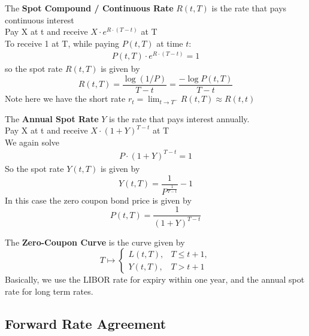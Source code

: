 \begin{definition}
    The \textbf{Spot Compound / Continuous Rate} $R(t, T)$ is the rate that pays continuous interest\\
    Pay X at t and receive $X \cdot e^{R \cdot (T - t)}$ at T \\
    To receive 1 at T, while paying $P(t, T)$ at time $t$: 
    \begin{align*}
        P(t, T) \cdot e^{R \cdot (T - t)} = 1 
    \end{align*}
    so the spot rate $R(t, T)$ is given by
    $$
        R(t, T) = \frac{\log(1/P)}{T - t} = 
        \frac{-\log P(t, T)}{T - t}
    $$
    Note here we have the short rate $r_t = \lim_{t \to T^-}R(t, T) \approx R(t, t)$
\end{definition}

\begin{definition}
    The \textbf{Annual Spot Rate} $Y$ is the rate that pays interest annually. \\
    Pay X at t and receive $X \cdot (1 + Y)^{T - t}$ at T \\
    We again solve
    \begin{align*}
        P \cdot (1 + Y)^{T - t} = 1
    \end{align*}
    So the spot rate $Y(t, T)$ is given by
    $$
        Y(t, T) = \frac{1}{P^\frac{1}{T - t}} - 1
    $$
    In this case the zero coupon bond price is given by
    $$
        P(t, T) = \frac{1}{(1 + Y)^{T - t}}
    $$
\end{definition}

\begin{definition}
    The \textbf{Zero-Coupon Curve} is the curve given by
$$
    T \mapsto 
\begin{cases} 
    L(t, T), &  T \leq t+1, \\
    Y(t, T), & T > t + 1
\end{cases}
$$
Basically, we use the LIBOR rate for expiry within one year, and the annual spot rate for long term rates.
\end{definition}

\subsection{Forward Rate Agreement}

